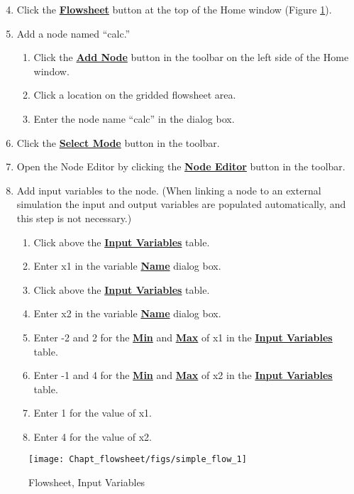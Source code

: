 \begin{enumerate}
	\setcounter{enumi}{3}
	\item Click the \textbf{\underline{Flowsheet}} button at the top of the Home window (Figure \ref{fig.simple.flow1}).
	\item Add a node named ``calc.''
	\begin{enumerate}
		\item Click the \textbf{\underline{Add Node}} button in the toolbar on the left side of the Home window.
		\item Click a location on the gridded flowsheet area.
		\item Enter the node name ``calc'' in the dialog box.
	\end{enumerate}
	\item Click the \textbf{\underline{Select Mode}} button in the toolbar.
	\item Open the Node Editor by clicking the \textbf{\underline{Node Editor}} button in the toolbar.
	\item Add input variables to the node. (When linking a node to an external simulation the input and output variables are populated automatically, and this step is not necessary.)
	\begin{enumerate}
		\item Click \bu{+} above the \textbf{\underline{Input Variables}} table.
		\item Enter x1 in the variable \textbf{\underline{Name}} dialog box.
		\item Click \bu{+} above the \textbf{\underline{Input Variables}} table.
		\item Enter x2 in the variable \textbf{\underline{Name}} dialog box.
		\item Enter -2 and 2 for the \textbf{\underline{Min}} and \textbf{\underline{Max}} of x1 in the \textbf{\underline{Input Variables}} table.
		\item Enter -1 and 4 for the \textbf{\underline{Min}} and \textbf{\underline{Max}} of x2 in the \textbf{\underline{Input Variables}} table.
		\item Enter 1 for the value of x1.
		\item Enter 4 for the value of x2.
	\end{enumerate}
\end{enumerate}

\begin{figure}[H]
	\begin{center}
		\texttt{[image: Chapt\_flowsheet/figs/simple\_flow\_1]}
		\caption{Flowsheet, Input Variables}
		\label{fig.simple.flow1}
	\end{center}
\end{figure}

